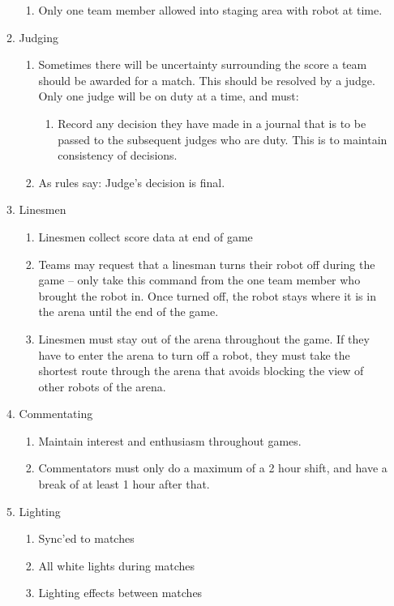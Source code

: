 \begin{enumerate}
\begin{enumerate}
\begin{enumerate}
    \item Only one team member allowed into staging area with robot at time.
    \end{enumerate}

  \item Judging
    \begin{enumerate}
    \item Sometimes there will be uncertainty surrounding the score a team should be awarded for a match.  This should be resolved by a judge.  Only one judge will be on duty at a time, and must:
      \begin{enumerate}
      \item Record any decision they have made in a journal that is to be passed to the subsequent judges who are duty.  This is to maintain consistency of decisions.
      \end{enumerate}
    \item As rules say: Judge's decision is final.
    \end{enumerate}

  \item Linesmen
    \begin{enumerate}
    \item Linesmen collect score data at end of game
    \item Teams may request that a linesman turns their robot off during the game -- only take this command from the one team member who brought the robot in.  Once turned off, the robot stays where it is in the arena until the end of the game.
    \item Linesmen must stay out of the arena throughout the game.  If they have to enter the arena to turn off a robot, they must take the shortest route through the arena that avoids blocking the view of other robots of the arena.
    \end{enumerate}

  \item Commentating
    \begin{enumerate}
    \item Maintain interest and enthusiasm throughout games.
    \item Commentators must only do a maximum of a 2 hour shift, and have a break of at least 1 hour after that.
    \end{enumerate}


  \item Lighting
    \begin{enumerate}
    \item Sync'ed to matches
    \item All white lights during matches
    \item Lighting effects between matches
    \end{enumerate}


\end{enumerate}
\end{enumerate}
